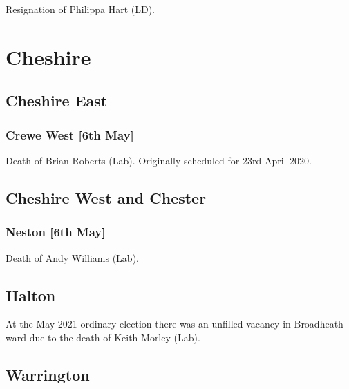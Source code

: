 \documentclass[a4paper,openany]{book}
\begin{document}
\begin{resultsiii}

Resignation of Philippa Hart (LD).

\section{Cheshire}

\subsection*{Cheshire East}

\subsubsection*{Crewe West \hspace*{\fill}\nolinebreak[1]%
	\enspace\hspace*{\fill}
	[6th May]}


Death of Brian Roberts (Lab).  Originally scheduled for 23rd April 2020.

\subsection*{Cheshire West and Chester}

\subsubsection*{Neston \hspace*{\fill}\nolinebreak[1]%
	\enspace\hspace*{\fill}
	[6th May]}


Death of Andy Williams (Lab).

\subsection*{Halton}

At the May 2021 ordinary election there was an unfilled vacancy in Broadheath ward due to the death of Keith Morley (Lab).

\subsection*{Warrington}


\end{resultsiii}
\end{document}
